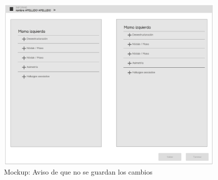 \begin{figure}[ht]
\centering
\includegraphics[page=12,scale=0.4]{./imgs/mockup/mockup.pdf}
\caption{Mockup: Aviso de que no se guardan los cambios}
\label{fig:mockup:warning}
\end{figure}


